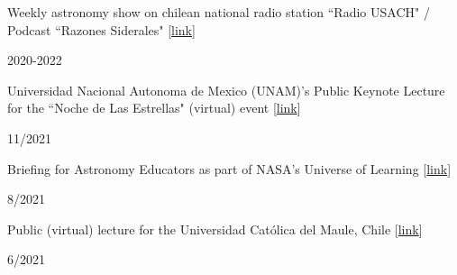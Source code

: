 \documentclass[12pt, a4paper]{article} %
\begin{document}
\vspace{0.2cm}

\begin{minipage}[t]{0.7\textwidth}
\begin{flushleft}%
  \setlength{\leftskip}{0.2cm}%
Weekly astronomy show on chilean national radio station ``Radio USACH" / Podcast ``Razones Siderales" [\href{https://open.spotify.com/show/6sK0izR6pdByqYPt0uuoal}{link}]
\end{flushleft}
\end{minipage}
\begin{minipage}[t]{0.3\textwidth}
\hfill 2020-2022
\end{minipage}

\vspace{0.2cm}

\begin{minipage}[t]{0.7\textwidth}
\begin{flushleft}%
  \setlength{\leftskip}{0.2cm}%
Universidad Nacional Autonoma de Mexico (UNAM)'s Public Keynote Lecture for the ``Noche de Las Estrellas" (virtual) event  [\href{https://youtu.be/6wq0XPsIdOk?t=12911}{link}]
\end{flushleft}
\end{minipage}
\begin{minipage}[t]{0.3\textwidth}
\hfill 11/2021
\end{minipage}

\vspace{0.2cm}

\begin{minipage}[t]{0.7\textwidth}
\begin{flushleft}%
  \setlength{\leftskip}{0.2cm}%
Briefing for Astronomy Educators as part of NASA's Universe of Learning [\href{https://www.universe-of-learning.org/science-briefings/2021/8/12/webb-unfolding-the-universe}{link}]
\end{flushleft}
\end{minipage}
\begin{minipage}[t]{0.3\textwidth}
\hfill 8/2021
\end{minipage}

\vspace{0.2cm}

\begin{minipage}[t]{0.7\textwidth}
\begin{flushleft}%
  \setlength{\leftskip}{0.2cm}%
Public (virtual) lecture for the Universidad Cat\'olica del Maule, Chile [\href{https://www.youtube.com/watch?v=vTd1w5LZnxA&list=PLZzSGxpMedi4A1anthGHRVeT0zMKOcYZo&index=6}{link}]
\end{flushleft}
\end{minipage}
\begin{minipage}[t]{0.3\textwidth}
\hfill 6/2021
\end{minipage}
\end{document}
